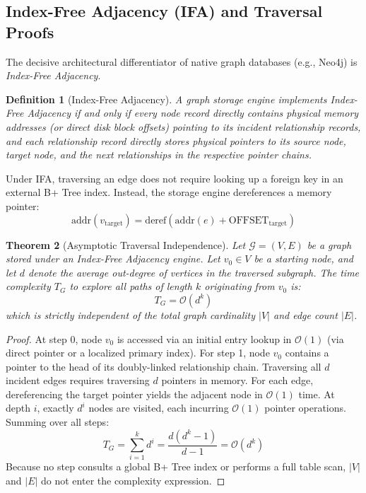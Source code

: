 \documentclass[10pt,twocolumn,letterpaper]{article}
\newtheorem{theorem}{Theorem}
\newtheorem{definition}[theorem]{Definition}
\begin{document}
\subsection{Index-Free Adjacency (IFA) and Traversal Proofs}
The decisive architectural differentiator of native graph databases (e.g., Neo4j) is \textit{Index-Free Adjacency}.

\begin{definition}[Index-Free Adjacency]
A graph storage engine implements Index-Free Adjacency if and only if every node record directly contains physical memory addresses (or direct disk block offsets) pointing to its incident relationship records, and each relationship record directly stores physical pointers to its source node, target node, and the next relationships in the respective pointer chains.
\end{definition}

Under IFA, traversing an edge does not require looking up a foreign key in an external B+ Tree index. Instead, the storage engine dereferences a memory pointer:
\begin{equation}
\text{addr}(v_{\text{target}}) = \text{deref}(\text{addr}(e) + \text{OFFSET}_{\text{target}})
\end{equation}

\begin{theorem}[Asymptotic Traversal Independence]
Let $\mathcal{G} = (V, E)$ be a graph stored under an Index-Free Adjacency engine. Let $v_0 \in V$ be a starting node, and let $d$ denote the average out-degree of vertices in the traversed subgraph. The time complexity $T_G$ to explore all paths of length $k$ originating from $v_0$ is:
\begin{equation}
T_G = \mathcal{O}(d^k)
\end{equation}
which is strictly independent of the total graph cardinality $|V|$ and edge count $|E|$.
\end{theorem}

\begin{proof}
At step 0, node $v_0$ is accessed via an initial entry lookup in $\mathcal{O}(1)$ (via direct pointer or a localized primary index). For step 1, node $v_0$ contains a pointer to the head of its doubly-linked relationship chain. Traversing all $d$ incident edges requires traversing $d$ pointers in memory. For each edge, dereferencing the target pointer yields the adjacent node in $\mathcal{O}(1)$ time. At depth $i$, exactly $d^i$ nodes are visited, each incurring $\mathcal{O}(1)$ pointer operations. Summing over all steps:
\begin{equation}
T_G = \sum_{i=1}^k d^i = \frac{d(d^k - 1)}{d - 1} = \mathcal{O}(d^k)
\end{equation}
Because no step consults a global B+ Tree index or performs a full table scan, $|V|$ and $|E|$ do not enter the complexity expression. \qedhere
\end{proof}
\end{document}

